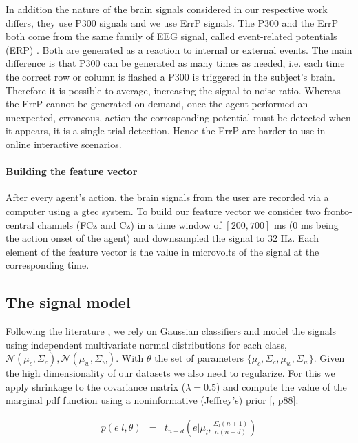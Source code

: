 In addition the nature of the brain signals considered in our respective work differs, they use P300 signals and we use ErrP signals. The P300 and the ErrP both come from the same family of EEG signal, called event-related potentials (ERP) \cite{chavarriaga2014errare}. Both are generated as a reaction to internal or external events. The main difference is that P300 can be generated as many times as needed, i.e. each time the correct row or column is flashed a P300 is triggered in the subject's brain. Therefore it is possible to average, increasing the signal to noise ratio. Whereas the ErrP cannot be generated on demand, once the agent performed an unexpected, erroneous, action the corresponding potential must be detected when it appears, it is a single trial detection. Hence the ErrP are harder to use in online interactive scenarios.

\paragraph{Building the feature vector} After every agent's action, the brain signals from the user are recorded via a computer using a gtec system. To build our feature vector we consider two fronto-central channels (FCz and Cz) in a time window of $[200,700]$ ms (0 ms being the action onset of the agent) and downsampled the signal to $32$ Hz. Each element of the feature vector is the value in microvolts of the signal at the corresponding time. 

\subsection{The signal model}

Following the literature \cite{lotte2007review,blankertz2010single}, we rely on Gaussian classifiers and model the signals using independent multivariate normal distributions for each class, $\mathcal{N}(\mu_c, \Sigma_c), \mathcal{N}(\mu_w, \Sigma_w)$. With $\theta$ the set of parameters $\{\mu_c, \Sigma_c,\mu_w, \Sigma_w\}$. Given the high dimensionality of our datasets we also need to regularize. For this we apply shrinkage to the covariance matrix ($\lambda = 0.5$) and compute the value of the marginal pdf function using a noninformative (Jeffrey's) prior [\cite{gelman2003bayesian}, p88]:

\begin{eqnarray}
p(e|l, \theta) & = & t_{n-d}(e | \mu_l,\frac{\Sigma_l (n+1)}{n(n-d)})
\end{eqnarray}


